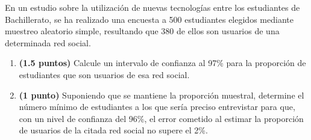 
En un estudio sobre la utilización de nuevas tecnologías entre los estudiantes de Bachillerato, se ha realizado una encuesta a 500 estudiantes elegidos mediante muestreo aleatorio simple, resultando que 380 de ellos son usuarios de una determinada red social.
\begin{enumerate}[label=\alph*)]
\item \textbf{(1.5 puntos)} Calcule un intervalo de confianza al 97\% para la proporción de estudiantes que son usuarios de esa red social.
\item \textbf{(1 punto)} Suponiendo que se mantiene la proporción muestral, determine el número mínimo de estudiantes a los que sería preciso entrevistar para que, con un nivel de confianza del 96\%, el error cometido al estimar la proporción de usuarios de la citada red social no supere el 2\%.
\end{enumerate}
